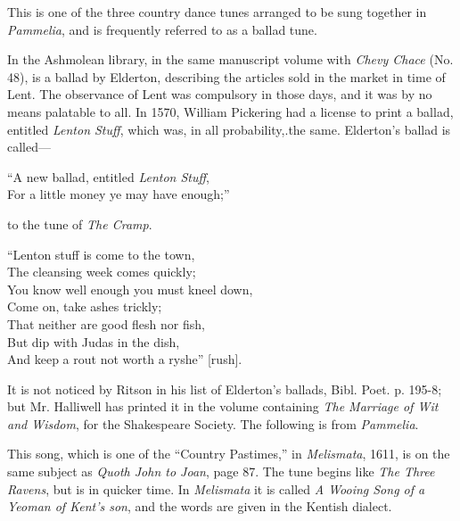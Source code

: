 
This is one of the three country dance tunes arranged to be sung together in
\textit{Pammelia}, and is frequently referred to as a ballad tune.

In the Ashmolean library, in the same manuscript volume with \textit{Chevy Chace}
(No. 48), is a ballad by Elderton, describing the articles sold in the market in
time of Lent. The observance of Lent was compulsory in those days, and it was
by no means palatable to all. In 1570, \pagebreak William Pickering had a license to print
a ballad, entitled \textit{Lenton Stuff}, which was, in all probability,.the same. Elderton’s
ballad is called—
\begin{scverse}
“A new ballad, entitled \textit{Lenton Stuff},\\
For a little money ye may have enough;”\\
\end{scverse}

\begin{center} to the tune of \textit{The Cramp}.\end{center}

\begin{scverse}
“Lenton stuff is come to the town,\\
\vin The cleansing week comes quickly;\\
You know well enough you must kneel down,\\
\vin Come on, take ashes trickly;\\
That neither are good flesh nor fish,\\
But dip with Judas in the dish,\\
And keep a rout not worth a ryshe” [rush].\\
\vin\vin\vin\vin\vin{}
\end{scverse}

It is not noticed by Ritson in his list of Elderton’s ballads, Bibl. Poet. p. 195-8;
but Mr. Halliwell has printed it in the volume containing \textit{The Marriage of Wit
and Wisdom}, for the Shakespeare Society. The following is from \textit{Pammelia}.


\smallskip



\pagebreak


This song, which is one of the “Country Pastimes,” in \textit{Melismata}, 1611, is on
the same subject as \textit{Quoth John to Joan}, page 87. The tune begins like \textit{The
Three Ravens}, but is in quicker time. In \textit{Melismata} it is called \textit{A Wooing Song
of a Yeoman of Kent's son}, and the words are given in the Kentish dialect.


